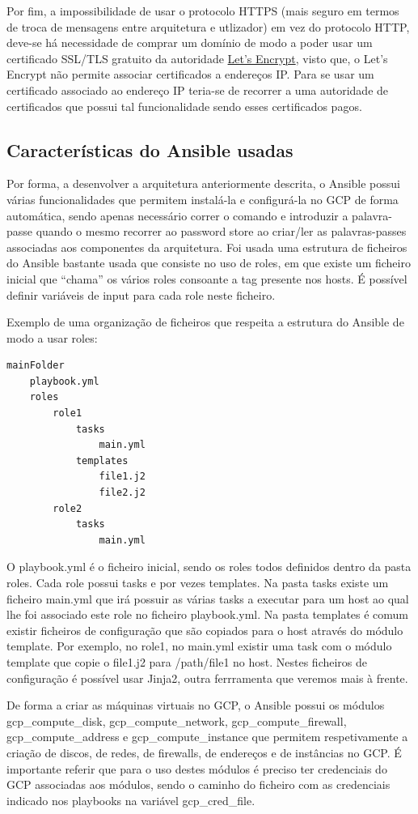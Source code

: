 \documentclass{article}
\begin{document}
Por fim, a impossibilidade de usar o protocolo HTTPS (mais seguro em termos de troca de mensagens entre arquitetura e utlizador) em vez do protocolo HTTP, deve-se há necessidade de comprar um domínio de modo a poder usar um certificado SSL/TLS gratuito da autoridade \href{https://letsencrypt.org/}{Let's Encrypt}, visto que, o Let's Encrypt não permite associar certificados a endereços IP. Para se usar um certificado associado ao endereço IP teria-se de recorrer a uma autoridade de certificados que possui tal funcionalidade sendo esses certificados pagos.

\subsection{Características do Ansible usadas}
Por forma, a desenvolver a arquitetura anteriormente descrita, o Ansible possui várias funcionalidades que permitem instalá-la e configurá-la no GCP de forma automática, sendo apenas necessário correr o comando e introduzir a palavra-passe quando o mesmo recorrer ao password store ao criar/ler as palavras-passes associadas aos componentes da arquitetura.
Foi usada uma estrutura de ficheiros do Ansible bastante usada que consiste no uso de roles, em que existe um ficheiro inicial que ``chama'' os vários roles consoante a tag presente nos hosts. É possível definir variáveis de input para cada role neste ficheiro. 

Exemplo de uma organização de ficheiros que respeita a estrutura do Ansible de modo a usar roles:
\begin{verbatim}
mainFolder
    playbook.yml
    roles
        role1
            tasks
                main.yml
            templates
                file1.j2
                file2.j2
        role2
            tasks
                main.yml
\end{verbatim}
O playbook.yml é o ficheiro inicial, sendo os roles todos definidos dentro da pasta roles. Cada role possui tasks e por vezes templates. Na pasta tasks existe um ficheiro main.yml que irá possuir as várias tasks a executar para um host ao qual lhe foi associado este role no ficheiro playbook.yml. Na pasta templates é comum existir ficheiros de configuração que são copiados para o host através do módulo template. Por exemplo, no role1, no main.yml existir uma task com o módulo template que copie o file1.j2 para /path/file1 no host. Nestes ficheiros de configuração é possível usar Jinja2, outra ferrramenta que veremos mais à frente.

De forma a criar as máquinas virtuais no GCP, o Ansible possui os módulos gcp\_compute\_disk, gcp\_compute\_network, gcp\_compute\_firewall, gcp\_compute\_address e gcp\_compute\_instance que permitem respetivamente a criação de discos, de redes, de firewalls, de endereços e de instâncias no GCP. É importante referir que para o uso destes módulos é preciso ter credenciais do GCP associadas aos módulos, sendo o caminho do ficheiro com as credenciais indicado nos playbooks na variável gcp\_cred\_file.
\end{document}
